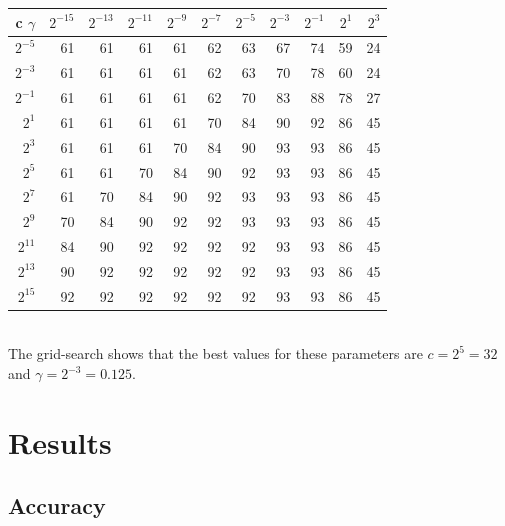 \documentclass[a4paper]{article}
\begin{document}
\begin{tabular}{|r|r r r r r r r r r r|}
\hline
c $\gamma$ & $2^{-15}$ & $2^{-13}$ & $2^{-11}$ & $2^{-9}$ & $2^{-7}$ &
	$2^{-5}$ & $2^{-3}$ & $2^{-1}$ & $2^{1}$ & $2^{3}$\\
\hline
$2^{-5}$ &       61 &       61 &       61 &       61 &       62 &
       63 &       67 &       74 &       59 &       24\\
$2^{-3}$ &       61 &       61 &       61 &       61 &       62 &
       63 &       70 &       78 &       60 &       24\\
$2^{-1}$ &       61 &       61 &       61 &       61 &       62 &
       70 &       83 &       88 &       78 &       27\\
 $2^{1}$ &       61 &       61 &       61 &       61 &       70 &
        84 &       90 &       92 &       86 &       45\\
 $2^{3}$ &       61 &       61 &       61 &       70 &       84 &
        90 &       93 &       93 &       86 &       45\\
 $2^{5}$ &       61 &       61 &       70 &       84 &       90 &
        92 &       93 &       93 &       86 &       45\\
 $2^{7}$ &       61 &       70 &       84 &       90 &       92 &
        93 &       93 &       93 &       86 &       45\\
 $2^{9}$ &       70 &       84 &       90 &       92 &       92 &
       93 &       93 &       93 &       86 &       45\\
$2^{11}$ &       84 &       90 &       92 &       92 &       92 &
       92 &       93 &       93 &       86 &       45\\
$2^{13}$ &       90 &       92 &       92 &       92 &       92 &
       92 &       93 &       93 &       86 &       45\\
$2^{15}$ &       92 &       92 &       92 &       92 &       92 &
       92 &       93 &       93 &       86 &       45\\
\hline
\end{tabular} \\

The grid-search shows that the best values for these parameters are $c = 2^5 =
32$ and $\gamma = 2^{-3} = 0.125$.

\section{Results}

\subsection{Accuracy}
\end{document}
